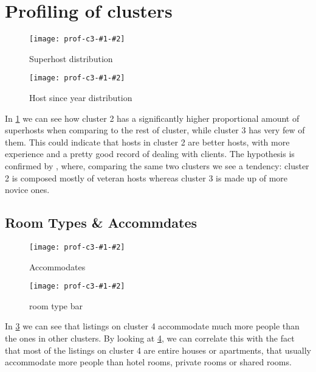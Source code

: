 
\section{Profiling of clusters}%
\label{sec:profiling_of_clusters}

\newcommand{\profiling}[3]{
\begin{figure}[H]
    \centering
    \texttt{[image: prof-c3-\#1-\#2]}
    \caption{#3}%
    \label{fig:prof-#1-#2}
\end{figure}
}


\profiling{host_is_superhost}{side}{Superhost distribution}
\profiling{host_since_year}{percent}{Host since year distribution}
In \cref{fig:prof-host_is_superhost-side} we can see how cluster 2 has a significantly higher proportional amount of superhosts when comparing to the rest of cluster, while cluster 3 has very few of them. This could indicate that hosts in cluster 2 are better hosts, with more experience and a pretty good record of dealing with clients. The hypothesis is confirmed by , where, comparing the same two clusters we see a tendency: cluster 2 is composed mostly of veteran hosts whereas cluster 3 is made up of more novice ones.




\clearpage
\subsection{Room Types \& Accommdates}%





\profiling{accommodates}{meanp}{Accommodates}
\profiling{room_type}{side}{room type bar}
In \cref{fig:prof-accommodates-meanp} we can see that listings on cluster 4 accommodate
much more people than the ones in other clusters. By looking at \cref{fig:prof-room_type-side}, we can correlate this with the fact that most of the listings on cluster 4 are entire houses or apartments, that usually accommodate more people than hotel rooms, private rooms or shared rooms. 

